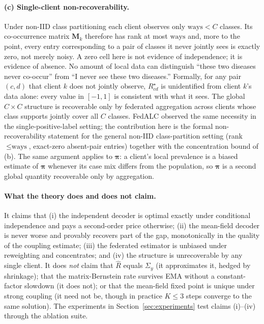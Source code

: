 \documentclass[11pt,a4paper]{article}
\theoremstyle{definition}
\newcommand{\Rhat}{\widehat{R}}
\newcommand{\Sigmay}{\Sigma_{y}}
\begin{document}
\paragraph{(c) Single-client non-recoverability.} Under non-IID class partitioning each client observes only $\text{ways}<C$ classes. Its co-occurrence matrix $\mathbf{M}_k$ therefore has rank at most $\text{ways}$ and, more to the point, every entry corresponding to a pair of classes it never jointly sees is exactly zero, not merely noisy. A zero cell here is not evidence of independence; it is evidence of absence. No amount of local data can distinguish ``these two diseases never co-occur'' from ``I never see these two diseases.'' Formally, for any pair $(c,d)$ that client $k$ does not jointly observe, $R^{\star}_{cd}$ is unidentified from client $k$'s data alone: every value in $[-1,1]$ is consistent with what it sees. The global $C\times C$ structure is recoverable only by federated aggregation across clients whose class supports jointly cover all $C$ classes. FedALC \citep{an2024fedalc} observed the same necessity in the single-positive-label setting; the contribution here is the formal non-recoverability statement for the general non-IID class-partition setting (rank $\le\text{ways}$, exact-zero absent-pair entries) together with the concentration bound of (b). The same argument applies to $\boldsymbol\pi$: a client's local prevalence is a biased estimate of $\boldsymbol\pi$ whenever its case mix differs from the population, so $\boldsymbol\pi$ is a second global quantity recoverable only by aggregation.

\paragraph{What the theory does and does not claim.} It claims that (i) the independent decoder is optimal exactly under conditional independence and pays a second-order price otherwise; (ii) the mean-field decoder is never worse and provably recovers part of the gap, monotonically in the quality of the coupling estimate; (iii) the federated estimator is unbiased under reweighting and concentrates; and (iv) the structure is unrecoverable by any single client. It does \emph{not} claim that $\Rhat$ equals $\Sigmay$ (it approximates it, hedged by shrinkage); that the matrix-Bernstein rate survives EMA without a constant-factor slowdown (it does not); or that the mean-field fixed point is unique under strong coupling (it need not be, though in practice $K\le 3$ steps converge to the same solution). The experiments in Section~\ref{sec:experiments} test claims (i)--(iv) through the ablation suite.
\end{document}
